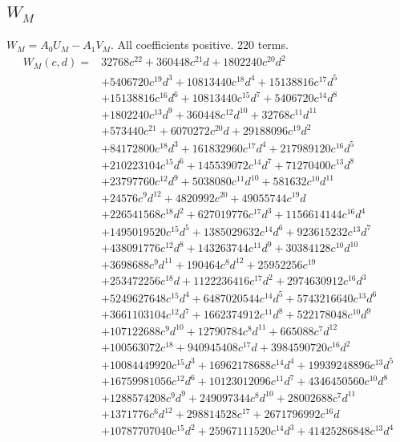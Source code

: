 \subsection*{$W_M$}
$W_M=A_0U_M-A_1V_M$. All coefficients positive. 220 terms.
{\small
\begin{align*}
W_M(c,d)={}&32768c^{22}+360448c^{21}d+1802240c^{20}d^{2}\\
&+5406720c^{19}d^{3}+10813440c^{18}d^{4}+15138816c^{17}d^{5}\\
&+15138816c^{16}d^{6}+10813440c^{15}d^{7}+5406720c^{14}d^{8}\\
&+1802240c^{13}d^{9}+360448c^{12}d^{10}+32768c^{11}d^{11}\\
&+573440c^{21}+6070272c^{20}d+29188096c^{19}d^{2}\\
&+84172800c^{18}d^{3}+161832960c^{17}d^{4}+217989120c^{16}d^{5}\\
&+210223104c^{15}d^{6}+145539072c^{14}d^{7}+71270400c^{13}d^{8}\\
&+23797760c^{12}d^{9}+5038080c^{11}d^{10}+581632c^{10}d^{11}\\
&+24576c^{9}d^{12}+4820992c^{20}+49055744c^{19}d\\
&+226541568c^{18}d^{2}+627019776c^{17}d^{3}+1156614144c^{16}d^{4}\\
&+1495019520c^{15}d^{5}+1385029632c^{14}d^{6}+923615232c^{13}d^{7}\\
&+438091776c^{12}d^{8}+143263744c^{11}d^{9}+30384128c^{10}d^{10}\\
&+3698688c^{9}d^{11}+190464c^{8}d^{12}+25952256c^{19}\\
&+253472256c^{18}d+1122236416c^{17}d^{2}+2974630912c^{16}d^{3}\\
&+5249627648c^{15}d^{4}+6487020544c^{14}d^{5}+5743216640c^{13}d^{6}\\
&+3661103104c^{12}d^{7}+1662374912c^{11}d^{8}+522178048c^{10}d^{9}\\
&+107122688c^{9}d^{10}+12790784c^{8}d^{11}+665088c^{7}d^{12}\\
&+100563072c^{18}+940945408c^{17}d+3984590720c^{16}d^{2}\\
&+10084449920c^{15}d^{3}+16962178688c^{14}d^{4}+19939248896c^{13}d^{5}\\
&+16759981056c^{12}d^{6}+10123012096c^{11}d^{7}+4346450560c^{10}d^{8}\\
&+1288574208c^{9}d^{9}+249097344c^{8}d^{10}+28002688c^{7}d^{11}\\
&+1371776c^{6}d^{12}+298814528c^{17}+2671796992c^{16}d\\
&+10787707040c^{15}d^{2}+25967111520c^{14}d^{3}+41425286848c^{13}d^{4}\\

\end{align*}}
